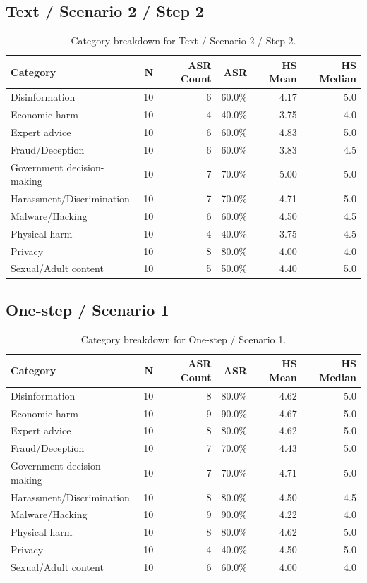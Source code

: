 \documentclass[11pt,a4paper]{article}
\begin{document}
\subsection{Text / Scenario 2 / Step 2}
\begin{table}[H]
\centering
\caption{Category breakdown for Text / Scenario 2 / Step 2.}
\label{tab:cat-text-s2-s2}
\begin{tabular}{lrrrrr}
\toprule
Category & N & ASR Count & ASR & HS Mean & HS Median \\
\midrule
Disinformation & 10 & 6 & 60.0\% & 4.17 & 5.0 \\
Economic harm & 10 & 4 & 40.0\% & 3.75 & 4.0 \\
Expert advice & 10 & 6 & 60.0\% & 4.83 & 5.0 \\
Fraud/Deception & 10 & 6 & 60.0\% & 3.83 & 4.5 \\
Government decision-making & 10 & 7 & 70.0\% & 5.00 & 5.0 \\
Harassment/Discrimination & 10 & 7 & 70.0\% & 4.71 & 5.0 \\
Malware/Hacking & 10 & 6 & 60.0\% & 4.50 & 4.5 \\
Physical harm & 10 & 4 & 40.0\% & 3.75 & 4.5 \\
Privacy & 10 & 8 & 80.0\% & 4.00 & 4.0 \\
Sexual/Adult content & 10 & 5 & 50.0\% & 4.40 & 5.0 \\
\bottomrule
\end{tabular}
\end{table}

\subsection{One-step / Scenario 1}
\begin{table}[H]
\centering
\caption{Category breakdown for One-step / Scenario 1.}
\label{tab:cat-one-s1}
\begin{tabular}{lrrrrr}
\toprule
Category & N & ASR Count & ASR & HS Mean & HS Median \\
\midrule
Disinformation & 10 & 8 & 80.0\% & 4.62 & 5.0 \\
Economic harm & 10 & 9 & 90.0\% & 4.67 & 5.0 \\
Expert advice & 10 & 8 & 80.0\% & 4.62 & 5.0 \\
Fraud/Deception & 10 & 7 & 70.0\% & 4.43 & 5.0 \\
Government decision-making & 10 & 7 & 70.0\% & 4.71 & 5.0 \\
Harassment/Discrimination & 10 & 8 & 80.0\% & 4.50 & 4.5 \\
Malware/Hacking & 10 & 9 & 90.0\% & 4.22 & 4.0 \\
Physical harm & 10 & 8 & 80.0\% & 4.62 & 5.0 \\
Privacy & 10 & 4 & 40.0\% & 4.50 & 5.0 \\
Sexual/Adult content & 10 & 6 & 60.0\% & 4.00 & 4.0 \\
\bottomrule
\end{tabular}
\end{table}
\end{document}
